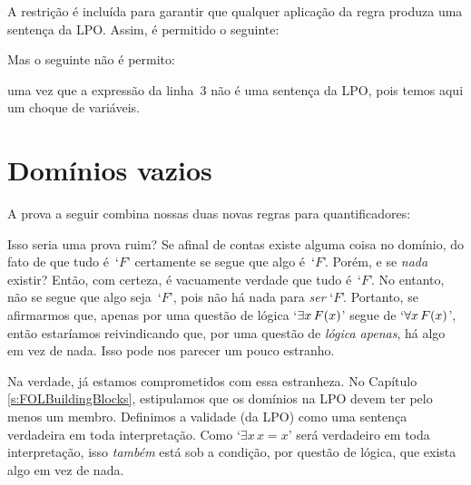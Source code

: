 A restrição é incluída para garantir que qualquer aplicação da regra produza uma sentença da LPO. Assim, é permitido o seguinte:

\begin{fitchproof}
	 
	 
\end{fitchproof}
Mas o seguinte  não é permito:
\begin{fitchproof}
	 
\end{fitchproof}
uma vez que a expressão da linha~3 não é uma sentença da LPO, pois 
temos aqui um choque de variáveis.

\section{Domínios vazios}
A prova a seguir combina nossas duas novas regras para quantificadores:
	\begin{fitchproof}
	\end{fitchproof}
Isso seria uma prova ruim? 
Se afinal de contas existe alguma coisa no domínio, do fato de que tudo é~`$F$'
certamente se segue que algo é~`$F$'.  Porém, e se \emph{nada} existir? Então, com certeza, é vacuamente verdade que tudo é~`$F$'. No entanto, não se segue que algo seja~`$F$', pois não há nada para \emph{ser}  `$F$'. Portanto, se afirmarmos que, apenas por uma questão de lógica  `$\exists x\,\mathord{F}(x)$' segue de `$\forall x\,\mathord{F}(x)$', então estaríamos reivindicando que,   por uma questão de \emph{lógica apenas}, há algo em vez de nada. Isso pode nos parecer um pouco estranho.

Na verdade, já estamos comprometidos com essa estranheza. No Capítulo  \ref{s:FOLBuildingBlocks},  estipulamos que os domínios na LPO devem ter pelo menos um membro. Definimos a validade (da LPO) como uma sentença verdadeira em toda interpretação. Como `$\exists x\, x=x$' será verdadeiro em toda interpretação, isso \emph{também} está sob a condição, por questão de lógica,  que exista algo em vez de nada.

